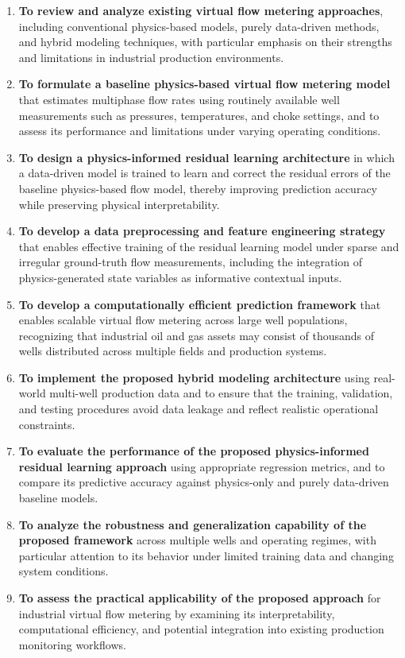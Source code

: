 \documentclass[12pt,APA]{uomthesis}
\begin{document}
\begin{enumerate}
    \item \textbf{To review and analyze existing virtual flow metering approaches}, including conventional physics-based models, purely data-driven methods, and hybrid modeling techniques, with particular emphasis on their strengths and limitations in industrial production environments.

    \item \textbf{To formulate a baseline physics-based virtual flow metering model} that estimates multiphase flow rates using routinely available well measurements such as pressures, temperatures, and choke settings, and to assess its performance and limitations under varying operating conditions.

    \item \textbf{To design a physics-informed residual learning architecture} in which a data-driven model is trained to learn and correct the residual errors of the baseline physics-based flow model, thereby improving prediction accuracy while preserving physical interpretability.

    \item \textbf{To develop a data preprocessing and feature engineering strategy} that enables effective training of the residual learning model under sparse and irregular ground-truth flow measurements, including the integration of physics-generated state variables as informative contextual inputs.

    \item \textbf{To develop a computationally efficient prediction framework} that enables scalable virtual flow metering across large well populations, recognizing that industrial oil and gas assets may consist of thousands of wells distributed across multiple fields and production systems.

    \item \textbf{To implement the proposed hybrid modeling architecture} using real-world multi-well production data and to ensure that the training, validation, and testing procedures avoid data leakage and reflect realistic operational constraints.

    \item \textbf{To evaluate the performance of the proposed physics-informed residual learning approach} using appropriate regression metrics, and to compare its predictive accuracy against physics-only and purely data-driven baseline models.

    \item \textbf{To analyze the robustness and generalization capability of the proposed framework} across multiple wells and operating regimes, with particular attention to its behavior under limited training data and changing system conditions.

    \item \textbf{To assess the practical applicability of the proposed approach} for industrial virtual flow metering by examining its interpretability, computational efficiency, and potential integration into existing production monitoring workflows.
\end{enumerate}
\end{document}
